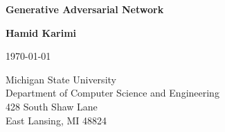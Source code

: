 \documentclass[12pt]{article}
\begin{document}
\begin{titlepage}
    \begin{center}
        \vspace*{3cm}
        
        

        
        \vspace{0.25cm}
        {\Huge \textbf{Generative Adversarial Network }\par}
             

        
        \vspace{1.5cm}
        
                {\fontsize{18}{30}\selectfont \textbf{\textbf{Hamid Karimi}}}
 
        
        \vspace{.75 cm}
        
		\today        
       
        \vspace{4 cm}
        

        Michigan State University \\
        Department of Computer Science and Engineering\\
        428 South Shaw Lane \\
        East Lansing, MI 48824         
    \end{center}
\end{titlepage}


\newpage




\end{document}
